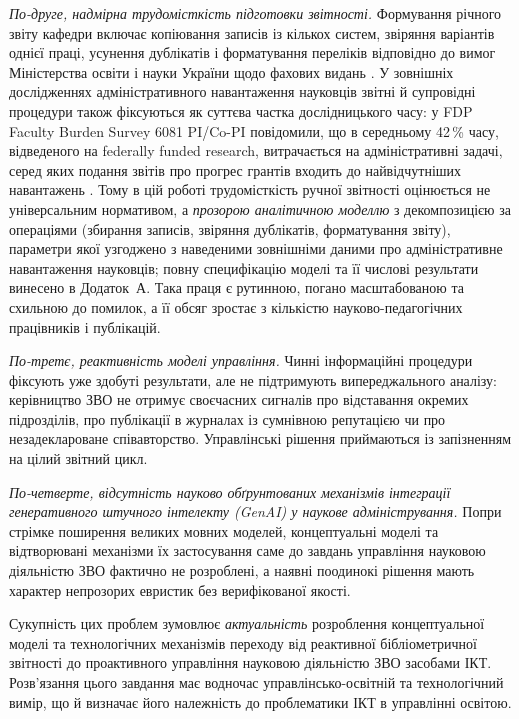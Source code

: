 \textit{По-друге, надмірна трудомісткість підготовки звітності.} Формування річного звіту кафедри включає копіювання записів із кількох систем, звіряння варіантів однієї праці, усунення дублікатів і форматування переліків відповідно до вимог Міністерства освіти і науки України щодо фахових видань \cite{MONUkraine2023ProfessionalJournalsOrder}. У зовнішніх дослідженнях адміністративного навантаження науковців звітні й супровідні процедури також фіксуються як суттєва частка дослідницького часу: у FDP Faculty Burden Survey 6081 PI/Co-PI повідомили, що в середньому 42\,\% часу, відведеного на federally funded research, витрачається на адміністративні задачі, серед яких подання звітів про прогрес грантів входить до найвідчутніших навантажень \cite{Rockwell2009FDPBurden}. Тому в цій роботі трудомісткість ручної звітності оцінюється не універсальним нормативом, а \textit{прозорою аналітичною моделлю} з декомпозицією за операціями (збирання записів, звіряння дублікатів, форматування звіту), параметри якої узгоджено з наведеними зовнішніми даними про адміністративне навантаження науковців; повну специфікацію моделі та її числові результати винесено в Додаток~А. Така праця є рутинною, погано масштабованою та схильною до помилок, а її обсяг зростає з кількістю науково-педагогічних працівників і публікацій.

\textit{По-третє, реактивність моделі управління.} Чинні інформаційні процедури фіксують уже здобуті результати, але не підтримують випереджального аналізу: керівництво ЗВО не отримує своєчасних сигналів про відставання окремих підрозділів, про публікації в журналах із сумнівною репутацією чи про незадеклароване співавторство. Управлінські рішення приймаються із запізненням на цілий звітний цикл.

\textit{По-четверте, відсутність науково обґрунтованих механізмів інтеграції генеративного штучного інтелекту (GenAI) у наукове адміністрування.} Попри стрімке поширення великих мовних моделей, концептуальні моделі та відтворювані механізми їх застосування саме до завдань управління науковою діяльністю ЗВО фактично не розроблені, а наявні поодинокі рішення мають характер непрозорих евристик без верифікованої якості.

Сукупність цих проблем зумовлює \textit{актуальність} розроблення концептуальної моделі та технологічних механізмів переходу від реактивної бібліометричної звітності до проактивного управління науковою діяльністю ЗВО засобами ІКТ. Розв'язання цього завдання має водночас управлінсько-освітній та технологічний вимір, що й визначає його належність до проблематики ІКТ в управлінні освітою.

